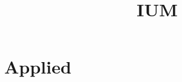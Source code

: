 \documentclass{article}
\begin{document}
\title{IUM}

\maketitle

\tableofcontents

\section{Applied}
\end{document}

